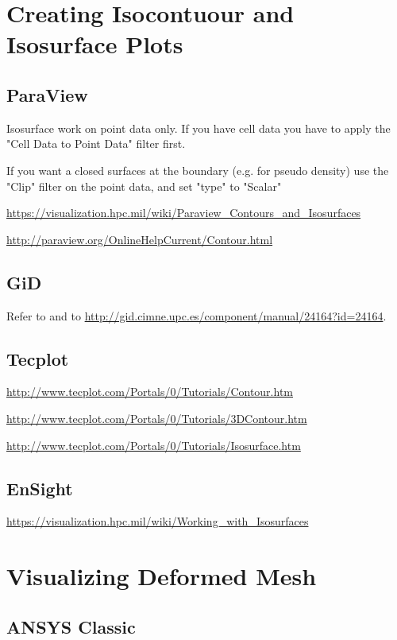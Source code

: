 \section{Creating Isocontuour and Isosurface Plots}

\subsection{ParaView}

Isosurface work on  point data only. If  you have cell data you  have to apply
the "Cell Data to Point Data" filter first.

If you  want a closed surfaces at  the boundary (e.g. for  pseudo density) use
the "Clip" filter on the point data, and set "type" to "Scalar"

\url{https://visualization.hpc.mil/wiki/Paraview_Contours_and_Isosurfaces}

\url{http://paraview.org/OnlineHelpCurrent/Contour.html}

\subsection{GiD}
Refer   to   \cite{Simkovics2010}   and   to
\url{http://gid.cimne.upc.es/component/manual/24164?id=24164}.


\subsection{Tecplot}
\url{http://www.tecplot.com/Portals/0/Tutorials/Contour.htm}

\url{http://www.tecplot.com/Portals/0/Tutorials/3DContour.htm}

\url{http://www.tecplot.com/Portals/0/Tutorials/Isosurface.htm}

\subsection{EnSight}
\url{https://visualization.hpc.mil/wiki/Working_with_Isosurfaces}

\section{Visualizing Deformed Mesh}

\subsection{ANSYS Classic}

